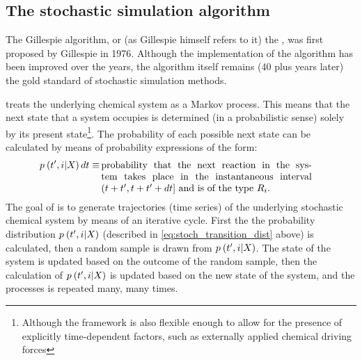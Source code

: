 \subsection{The stochastic simulation algorithm}

The Gillespie algorithm, or (as Gillespie himself refers to it\supercite{Gillespie:2013kk}) the , was first proposed by Gillespie in 1976\supercite{Gillespie:1976bj}. Although the implementation of the algorithm has been improved\supercite{Gibson:2000jqa,Cao:2004cua,Lok:2005ii,McCollum:2006hj} over the years, the algorithm itself remains (40 plus years later) the gold standard of stochastic simulation methods.

 treats the underlying chemical system as a Markov process. This means that the next state that a system occupies is determined (in a probabilistic sense) solely by its present state\footnote{Although the framework is also flexible enough to allow for the presence of explicitly time-dependent factors, such as externally applied chemical driving forces}. The probability of each possible next state can be calculated by means of probability expressions of the form\supercite{Gillespie:1976bj}:
\begin{align}\label{eq:stoch_transition_dist}
    \transp \dt \equiv&\, \parbox[t]{0.63\linewidth}{probability that the next reaction in the system takes place in the instantaneous interval $\timeintp$ and is of the type $\rxn$.}
\end{align}
The goal of  is to generate trajectories (\ie time series) of the underlying stochastic chemical system by means of an iterative cycle. First the the probability distribution $p_{} \left( t', i | X_{} \right)$ (described in \eqref{eq:stoch_transition_dist} above) is calculated, then a random sample is drawn from $p_{} \left( t', i | X_{} \right)$. The state of the system is updated based on the outcome of the random sample, then the calculation of $p_{} \left( t', i | X_{} \right)$ is updated based on the new state of the system, and the processes is repeated many, many times.
 

